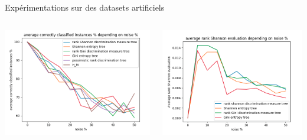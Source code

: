 \documentclass[usenames,dvipsnames]{beamer}
\begin{document}
\begin{frame}{Expérimentations sur des datasets artificiels}
    \begin{columns}
        \begin{column}{0.45\textwidth}
            \centering
            \includegraphics[width=\textwidth]{acc_2.png}
        \end{column}
        \begin{column}{0.45\textwidth}
            \centering
            \includegraphics[width=\textwidth]{shannon_eval_2.png}
        \end{column}
    \end{columns}
    \begin{columns}
        \begin{column}{0.45\textwidth}

\end{column}
\end{columns}
\end{frame}
\end{document}
